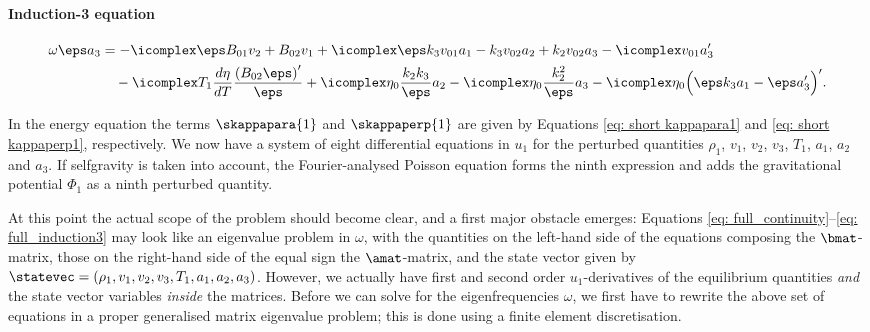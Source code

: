 \paragraph{Induction-3 equation}
{\customEquationFont
\begin{equation} \label{eq: full_induction3}
  \begin{aligned}
    \omega \eps a_3 &=
    - \icomplex \eps B_{01} v_2 + B_{02} v_1
    + \icomplex \eps k_3 v_{01} a_1
    - k_3 v_{02} a_2
    + k_2 v_{02} a_3
    - \icomplex v_{01} a_3' \\
    &\quad
    - \icomplex T_1 \frac{d\eta}{dT} \frac{\left(B_{02} \eps\right)'}{\eps}
    + \icomplex \eta_0 \frac{k_2 k_3}{\eps} a_2
    - \icomplex \eta_0 \frac{k_2^2}{\eps}a_3
    - \icomplex \eta_0 \Bigl(\eps k_3 a_1 - \eps a_3'\Bigr)'.
  \end{aligned}
\end{equation}
}

In the energy equation the terms $\skappapara{1}$ and $\skappaperp{1}$ are given by Equations \eqref{eq: short kappapara1} and \eqref{eq: short kappaperp1}, respectively. We now have a system of eight differential equations in $u_1$ for the perturbed quantities $\rho_1$, $v_1$, $v_2$, $v_3$, $T_1$, $a_1$, $a_2$ and $a_3$. If selfgravity is taken into account, the Fourier-analysed Poisson equation forms the ninth expression and adds the gravitational potential $\Phi_1$ as a ninth perturbed quantity.

At this point the actual scope of the problem should become clear, and a first major obstacle emerges: Equations \eqref{eq: full_continuity}--\eqref{eq: full_induction3} may look like an eigenvalue problem in $\omega$, with the quantities on the left-hand side of the equations composing the $\bmat$-matrix, those on the right-hand side of the equal sign the $\amat$-matrix, and the state vector given by $\statevec = (\rho_1, v_1, v_2, v_3, T_1, a_1, a_2, a_3)$. However, we actually have first and second order $u_1$-derivatives of the equilibrium quantities \emph{and} the state vector variables \emph{inside} the matrices.
Before we can solve for the eigenfrequencies $\omega$, we first have to rewrite the above set of equations in a proper generalised matrix eigenvalue problem; this is done using a finite element discretisation.


